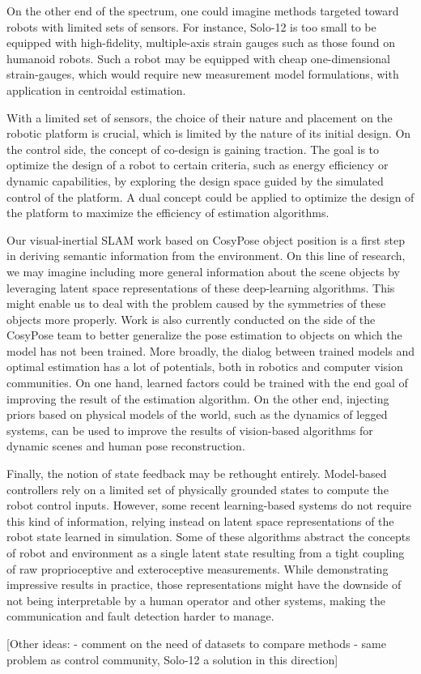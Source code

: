 On the other end of the spectrum, one could imagine methods targeted toward robots with limited sets of sensors. For instance, Solo-12 is too small to be 
equipped with high-fidelity, multiple-axis strain gauges such as those found on humanoid robots. Such a robot may be equipped with cheap
one-dimensional strain-gauges, which would require new measurement model formulations, with application in centroidal estimation.

With a limited set of sensors, the choice of their nature and placement on the robotic platform is crucial, which is limited by the nature of its initial design. 
On the control side, the concept of co-design is gaining traction. The goal is
to optimize the design of a robot to certain criteria, such as energy efficiency or dynamic capabilities, by exploring the design space guided by 
the simulated control of the platform. A dual concept could be applied to optimize the design of the platform to maximize the efficiency of estimation algorithms.

Our visual-inertial SLAM work based on CosyPose object position is a first step in deriving semantic information from the environment. On this line of research, we may imagine
including more general information about the scene objects by leveraging latent space representations of these deep-learning algorithms. This might enable us to deal with the problem
caused by the symmetries of these objects more properly. Work is also currently conducted on the side of the CosyPose team to better generalize the pose estimation to objects on which the 
model has not been trained. More broadly, the dialog between trained models and optimal estimation has a lot of potentials, both in robotics
and computer vision communities. On one hand, learned factors could be trained with the end goal of improving the result of the estimation algorithm. On the other end,
injecting priors based on physical models of the world, such as the dynamics of legged systems, can be used to improve the results of vision-based algorithms
for dynamic scenes and human pose reconstruction.


Finally, the notion of state feedback may be rethought entirely. Model-based controllers rely on a limited set of physically grounded states to compute the robot control inputs. 
However, some recent learning-based systems do not require this kind of information, relying instead on latent space representations of the robot state learned
in simulation. Some of these algorithms abstract the concepts of robot and environment as a single latent state resulting from a tight coupling of raw proprioceptive and exteroceptive
measurements. While demonstrating impressive results in practice, those representations might have the downside of not being interpretable by a human operator and other systems, 
making the communication and fault detection harder to manage.  

[Other ideas:
- comment on the need of datasets to compare methods
- same problem as control community, Solo-12 a solution in this direction]
